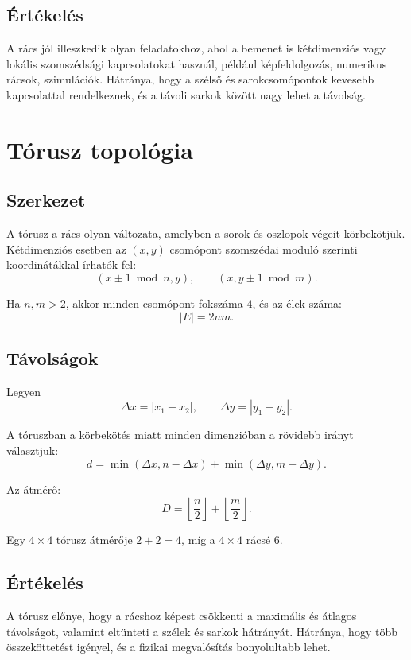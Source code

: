 \subsection{Értékelés}

A rács jól illeszkedik olyan feladatokhoz, ahol a bemenet is kétdimenziós vagy lokális szomszédsági kapcsolatokat használ, például képfeldolgozás, numerikus rácsok, szimulációk. Hátránya, hogy a szélső és sarokcsomópontok kevesebb kapcsolattal rendelkeznek, és a távoli sarkok között nagy lehet a távolság.

\section{Tórusz topológia}

\subsection{Szerkezet}

A tórusz a rács olyan változata, amelyben a sorok és oszlopok végeit körbekötjük. Kétdimenziós esetben az $(x,y)$ csomópont szomszédai moduló szerinti koordinátákkal írhatók fel:
\[
  (x\pm 1 \bmod n,y),\qquad (x,y\pm 1 \bmod m).
\]

Ha $n,m>2$, akkor minden csomópont fokszáma $4$, és az élek száma:
\[
  |E|=2nm.
\]

\subsection{Távolságok}

Legyen
\[
  \Delta x=|x_1-x_2|,
  \qquad
  \Delta y=|y_1-y_2|.
\]

A tóruszban a körbekötés miatt minden dimenzióban a rövidebb irányt választjuk:
\[
  d=\min(\Delta x,n-\Delta x)+\min(\Delta y,m-\Delta y).
\]

Az átmérő:
\[
  D=\left\lfloor\frac n2\right\rfloor+
    \left\lfloor\frac m2\right\rfloor.
\]

Egy $4\times 4$ tórusz átmérője $2+2=4$, míg a $4\times 4$ rácsé $6$.

\subsection{Értékelés}

A tórusz előnye, hogy a rácshoz képest csökkenti a maximális és átlagos távolságot, valamint eltünteti a szélek és sarkok hátrányát. Hátránya, hogy több összeköttetést igényel, és a fizikai megvalósítás bonyolultabb lehet.

